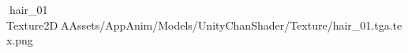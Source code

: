    hair_01            	   Texture2D   A   Assets/AppAnim/Models/UnityChanShader/Texture/hair_01.tga.tex.png